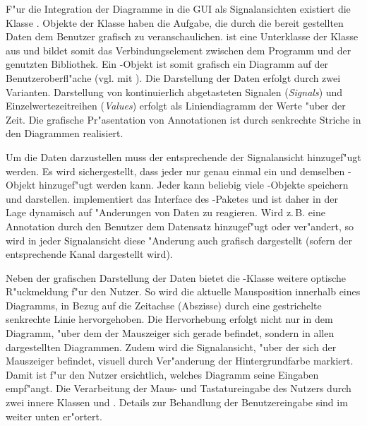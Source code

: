 F"ur die Integration der Diagramme in die \ac{GUI} als Signalansichten existiert die Klasse .
Objekte der Klasse haben die Aufgabe, die durch die  bereit gestellten Daten dem Benutzer grafisch zu veranschaulichen.
 ist eine Unterklasse der Klasse  aus \jfc und bildet somit das Verbindungselement zwischen dem Programm und der genutzten Bibliothek.
Ein -Objekt ist somit grafisch ein Diagramm auf der Benutzeroberfl"ache (vgl. mit ).
Die Darstellung der Daten erfolgt durch zwei Varianten.
Darstellung von kontinuierlich abgetasteten Signalen (\emph{Signals}) und Einzelwertezeitreihen (\emph{Values}) erfolgt als Liniendiagramm der Werte "uber der Zeit.
Die grafische Pr"asentation von Annotationen ist durch senkrechte Striche in den Diagrammen realisiert.

Um die Daten darzustellen muss der entsprechende  der Signalansicht hinzugef"ugt werden.
Es wird sichergestellt, dass jeder  nur genau einmal ein und demselben -Objekt hinzugef"ugt werden kann.
Jeder  kann beliebig viele -Objekte speichern und darstellen.
 implementiert das Interface  des -Paketes und ist daher in der Lage dynamisch auf "Anderungen von Daten zu reagieren.
Wird z.\,B. eine Annotation durch den Benutzer dem Datensatz hinzugef"ugt oder ver"andert, so wird in jeder Signalansicht diese "Anderung auch grafisch dargestellt (sofern der entsprechende Kanal dargestellt wird).

Neben der grafischen Darstellung der Daten bietet die -Klasse weitere optische R"uckmeldung f"ur den Nutzer.
So wird die aktuelle Mausposition innerhalb eines Diagramms, in Bezug auf die Zeitachse (Abszisse) durch eine gestrichelte senkrechte Linie hervorgehoben.
Die Hervorhebung erfolgt nicht nur in dem Diagramm, "uber dem der Mauszeiger sich gerade befindet, sondern in allen dargestellten Diagrammen.
Zudem wird die Signalansicht, "uber der sich der Mauszeiger befindet, visuell durch Ver"anderung der Hintergrundfarbe markiert.
Damit ist f"ur den Nutzer ersichtlich, welches Diagramm seine Eingaben empf"angt.
Die Verarbeitung der Maus- und Tastatureingabe des Nutzers durch zwei innere Klassen  und .
Details zur Behandlung der Benutzereingabe sind im  weiter unten er"ortert.

